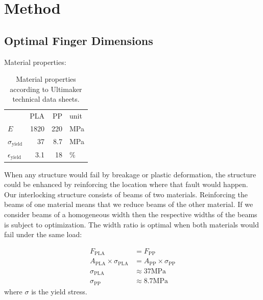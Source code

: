 

\section{Method}


\newpage

\subsection{Optimal Finger Dimensions}
Material properties:
\begin{table}[h!]
\centering
		\caption{Material properties according to Ultimaker technical data sheets.}
		\label{tab:mat_props}
	\begin{tabular}{lrrl}
		& PLA & PP & unit \\
		$E$ & {1820} &  {220} & \si{\mega\pascal} \\
		$\sigma_\text{yield}$ & {37}& {8.7} & \si{\mega\pascal} \\
		$\epsilon_\text{yield}$ & {3.1}& {18} & \si{\percent} \\
	\end{tabular}
\end{table}


When any structure would fail by breakage or plastic deformation,
the structure could be enhanced by reinforcing the location where that fault would happen.
Our interlocking structure consists of beams of two materials.
Reinforcing the beams of one material means that we reduce beams of the other material.
If we consider beams of a homogeneous width then the respective widths of the beams is subject to optimization.
The width ratio is optimal when both materials would fail under the same load:

\begin{align*}
	F_\text{PLA} &= F_\text{PP} \\
	A_\text{PLA} \times \sigma_\text{PLA} &= 	A_\text{PP} \times \sigma_\text{PP}\\
	\sigma_\text{PLA} &\approx 37 \si{\mega\pascal} \\
	\sigma_\text{PP} &\approx 8.7 \si{\mega\pascal}
\end{align*}
where $\sigma$ is the yield stress.

